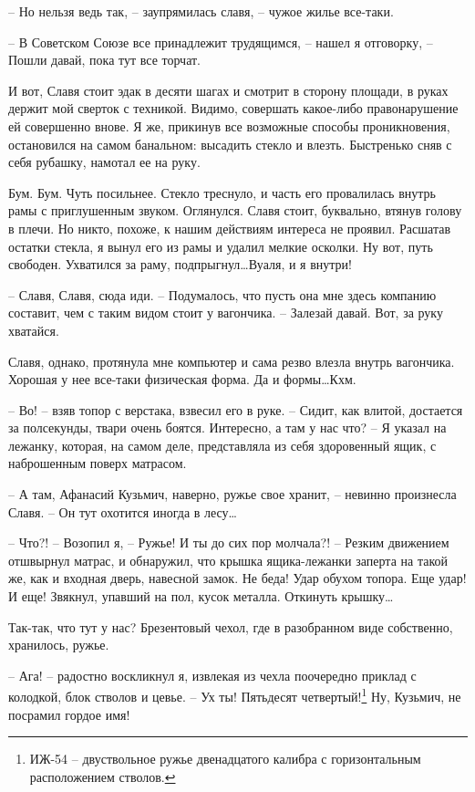 \documentclass[a4paper]{book}
\begin{document}
-- Но нельзя ведь так, -- заупрямилась славя, -- чужое жилье все-таки.

-- В Советском Союзе все принадлежит трудящимся, -- нашел я отговорку, -- Пошли давай, пока тут все торчат.

И вот, Славя стоит эдак в десяти шагах и смотрит в сторону площади, в руках держит мой сверток с техникой. Видимо, совершать какое-либо правонарушение ей совершенно внове. Я же, прикинув все возможные способы проникновения, остановился на самом банальном: высадить стекло и влезть. Быстренько сняв с себя рубашку, намотал ее на руку.

Бум. Бум. Чуть посильнее. Стекло треснуло, и часть его провалилась внутрь рамы с приглушенным звуком. Оглянулся. Славя стоит, буквально, втянув голову в плечи. Но никто, похоже, к нашим действиям интереса не проявил. Расшатав остатки стекла, я вынул его из рамы и удалил мелкие осколки. Ну вот, путь свободен. Ухватился за раму, подпрыгнул\ldots Вуаля, и я внутри!

-- Славя, Славя, сюда иди. -- Подумалось, что пусть она мне здесь компанию составит, чем с таким видом стоит у вагончика.  -- Залезай давай. Вот, за руку хватайся. 

Славя, однако, протянула мне компьютер  и сама резво влезла внутрь вагончика. Хорошая у нее все-таки физическая форма. Да и формы\ldots Кхм. 

-- Во! -- взяв топор с верстака, взвесил его в руке. -- Сидит, как влитой, достается за полсекунды, твари очень боятся. Интересно, а там у нас что? -- Я указал  на лежанку, которая, на самом деле, представляла из себя здоровенный ящик, с наброшенным поверх матрасом.

-- А там, Афанасий Кузьмич, наверно, ружье свое хранит, -- невинно произнесла Славя. -- Он тут охотится иногда в лесу\ldots

-- Что?! -- Возопил я, -- Ружье! И ты до сих пор молчала?! -- Резким движением  отшвырнул матрас, и обнаружил, что крышка ящика-лежанки заперта на такой же, как и входная дверь, навесной замок. Не беда! Удар обухом топора. Еще удар! И еще! Звякнул, упавший на пол, кусок металла. Откинуть крышку\ldots 

Так-так, что тут у нас? Брезентовый чехол, где в разобранном виде собственно, хранилось, ружье. 

-- Ага! -- радостно воскликнул я, извлекая из чехла поочередно приклад с колодкой, блок стволов и цевье. -- Ух ты! Пятьдесят четвертый!\footnote{ИЖ-54 -- двуствольное ружье двенадцатого калибра с горизонтальным расположением стволов.} Ну, Кузьмич, не посрамил гордое имя!
\end{document}
